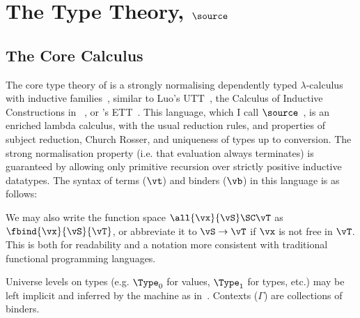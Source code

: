 \section{The Type Theory, $\source$}

\renewcommand{\Vnil}{\DC{vnil}}
\renewcommand{\Vcons}{\DC{vcons}}

\subsection{The Core Calculus}

\label{corett}

The core type theory of \Ivor{} is a strongly normalising dependently
typed $\lambda$-calculus with inductive families~\cite{dybjer94},
similar to Luo's UTT~\cite{luo94}, the Calculus of Inductive
Constructions in \Coq{}~\cite{coq-manual}, or \Epigram{}'s
ETT~\cite{epireloaded}.  This language, which I call
$\source$~\cite{brady-thesis}, is an enriched lambda calculus, with
the usual reduction rules, and properties of subject reduction, Church
Rosser, and uniqueness of types up to conversion. The strong
normalisation property (i.e. that evaluation always terminates) is
guaranteed by allowing only primitive recursion over strictly positive
inductive datatypes. The syntax of terms ($\vt$) and binders ($\vb$)
in this language is as follows:


We may also write the function space
\mbox{$\all{\vx}{\vS}\SC\vT$} as \mbox{$\fbind{\vx}{\vS}{\vT}$}, or
abbreviate it to \mbox{$\vS\to\vT$} if $\vx$ is not free in
$\vT$. This is both for readability and a notation more consistent
with traditional functional programming languages.

Universe levels on types (e.g. $\Type_0$ for values, $\Type_1$ for
types, etc.) may be left implicit and inferred
by the machine as in~\cite{implicit-pollack}.
Contexts ($\Gamma$) are collections of binders.

